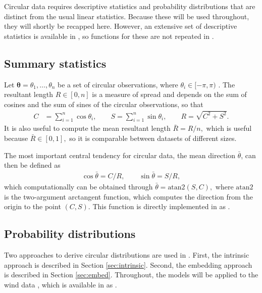 \label{circstats}

Circular data requires descriptive statistics and probability
distributions that are distinct from the usual linear statistics.
Because these will be used throughout, they will shortly be recapped
here. However, an extensive set of descriptive statistics is available
in , so functions for these are not repeated in
.

\hypertarget{summary-statistics}{%
\subsection{Summary statistics}\label{summary-statistics}}

Let \(\boldsymbol{\theta}= \theta_1, \dots, \theta_n\) be a set of
circular observations, where \(\theta_i \in [-\pi, \pi)\) . The
resultant length \(R\in[0, n]\) is a measure of spread and depends on
the sum of cosines and the sum of sines of the circular observations, so
that \begin{align}
C &= \sum_{i=1}^n\cos \theta_i, \qquad
S = \sum_{i=1}^n\sin \theta_i, \qquad
R = \sqrt{C^2 + S^2}.
\end{align} It is also useful to compute the mean resultant length
\(\bar{R} = R/n,\) which is useful because \(\bar{R} \in [0, 1],\) so it
is comparable between datasets of different sizes.

The most important central tendency for circular data, the mean
direction \(\bar\theta\), can then be defined as \begin{align}
\cos \bar \theta = C/R, \qquad
\sin \bar \theta = S/R,
\end{align} which computationally can be obtained through
\(\bar \theta = \text{atan2}(S, C),\) where \(\text{atan2}\) is the
two-argument arctangent function, which computes the direction from the
origin to the point \((C, S)\). This function is directly implemented in
 as .

\hypertarget{probability-distributions}{%
\subsection{Probability distributions}\label{probability-distributions}}

\label{sec:probdist} Two approaches to derive circular distributions are
used in . First, the intrinsic approach is described in
Section \ref{sec:intrinsic}. Second, the embedding approach is described
in Section \ref{sec:embed}. Throughout, the models will be applied to
the wind data \citep{agostinelli2007robust, fisher1995statistical},
which is available in  as .

